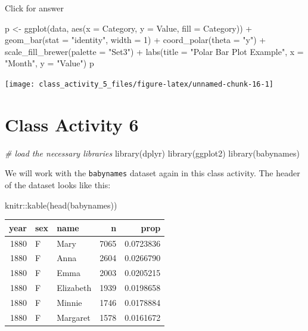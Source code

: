 \documentclass[
]{book}
\newenvironment{Shaded}{\begin{snugshade}}{\end{snugshade}}
\newcommand{\AttributeTok}[1]{\textcolor[rgb]{0.77,0.63,0.00}{#1}}
\newcommand{\CommentTok}[1]{\textcolor[rgb]{0.56,0.35,0.01}{\textit{#1}}}
\newcommand{\DecValTok}[1]{\textcolor[rgb]{0.00,0.00,0.81}{#1}}
\newcommand{\FunctionTok}[1]{\textcolor[rgb]{0.00,0.00,0.00}{#1}}
\newcommand{\NormalTok}[1]{#1}
\newcommand{\OtherTok}[1]{\textcolor[rgb]{0.56,0.35,0.01}{#1}}
\newcommand{\SpecialCharTok}[1]{\textcolor[rgb]{0.00,0.00,0.00}{#1}}
\newcommand{\StringTok}[1]{\textcolor[rgb]{0.31,0.60,0.02}{#1}}
\begin{document}
Click for answer

\begin{Shaded}
\begin{Highlighting}[]
\NormalTok{p }\OtherTok{\textless{}{-}} \FunctionTok{ggplot}\NormalTok{(data, }\FunctionTok{aes}\NormalTok{(}\AttributeTok{x =}\NormalTok{ Category, }\AttributeTok{y =}\NormalTok{ Value, }\AttributeTok{fill =}\NormalTok{ Category)) }\SpecialCharTok{+}
  \FunctionTok{geom\_bar}\NormalTok{(}\AttributeTok{stat =} \StringTok{"identity"}\NormalTok{, }\AttributeTok{width =} \DecValTok{1}\NormalTok{) }\SpecialCharTok{+}
  \FunctionTok{coord\_polar}\NormalTok{(}\AttributeTok{theta =} \StringTok{"y"}\NormalTok{) }\SpecialCharTok{+}
  \FunctionTok{scale\_fill\_brewer}\NormalTok{(}\AttributeTok{palette =} \StringTok{"Set3"}\NormalTok{) }\SpecialCharTok{+}
  \FunctionTok{labs}\NormalTok{(}\AttributeTok{title =} \StringTok{"Polar Bar Plot Example"}\NormalTok{, }\AttributeTok{x =} \StringTok{"Month"}\NormalTok{, }\AttributeTok{y =} \StringTok{"Value"}\NormalTok{)}
\NormalTok{p}
\end{Highlighting}
\end{Shaded}

\texttt{[image: class\_activity\_5\_files/figure-latex/unnamed-chunk-16-1]}

\hypertarget{class-activity-6}{%
\chapter{Class Activity 6}\label{class-activity-6}}

\begin{Shaded}
\begin{Highlighting}[]
\CommentTok{\# load the necessary libraries}
\FunctionTok{library}\NormalTok{(dplyr)}
\FunctionTok{library}\NormalTok{(ggplot2)}
\FunctionTok{library}\NormalTok{(babynames)}
\end{Highlighting}
\end{Shaded}

We will work with the \texttt{babynames} dataset again in this class activity. The header of the dataset looks like this:

\begin{Shaded}
\begin{Highlighting}[]
\NormalTok{knitr}\SpecialCharTok{::}\FunctionTok{kable}\NormalTok{(}\FunctionTok{head}\NormalTok{(babynames))}
\end{Highlighting}
\end{Shaded}

\begin{tabular}{r|l|l|r|r}
\hline
year & sex & name & n & prop\\
\hline
1880 & F & Mary & 7065 & 0.0723836\\
\hline
1880 & F & Anna & 2604 & 0.0266790\\
\hline
1880 & F & Emma & 2003 & 0.0205215\\
\hline
1880 & F & Elizabeth & 1939 & 0.0198658\\
\hline
1880 & F & Minnie & 1746 & 0.0178884\\
\hline
1880 & F & Margaret & 1578 & 0.0161672\\
\hline
\end{tabular}
\end{document}
